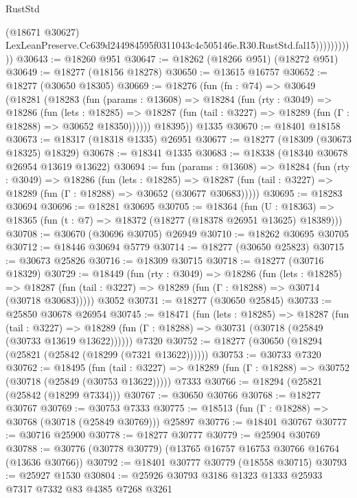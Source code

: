 \begin{lexlean}{RustStd}
\begin{coremodule}
                          (@18671 @30627)
                          LexLeanPreserve.Cc639d244984595f0311043c4c505146e.R30.RustStd.fal15)))))))))))
@30643 := @18260 @951
@30647 := @18262 (@18266 @951) (@18272 @951)
@30649 := @18277 (@18156 @18278)
@30650 := @13615 @16757
@30652 := @18277 (@30650 @18305)
@30669 := @18276
    (fun (fn : @74) =>
    @30649
      (@18281
        (@18283
          (fun (params : @13608) =>
          @18284
            (fun (rty : @3049) =>
            @18286
              (fun (lets : @18285) =>
              @18287 (fun (tail : @3227) => @18289 (fun (Γ : @18288) => @30652 @18350))))))
        @18395))
    @1335
@30670 := @18401 @18158
@30673 := @18317 (@18318 @1335) @26951
@30677 := @18277 (@18309 (@30673 @18325) @18329)
@30678 := @18341 @1335
@30683 := @18338 (@18340 @30678 @26954 @13619 @13622)
@30694 := fun (params : @13608) =>
  @18284
    (fun (rty : @3049) =>
    @18286
      (fun (lets : @18285) =>
      @18287 (fun (tail : @3227) => @18289 (fun (Γ : @18288) => @30652 (@30677 @30683)))))
@30695 := @18283 @30694
@30696 := @18281 @30695
@30705 := @18364
    (fun (U : @18363) => @18365 (fun (t : @7) => @18372 (@18277 (@18378 @26951 @13625) @18389)))
@30708 := @30670 (@30696 @30705) @26949
@30710 := @18262 @30695 @30705
@30712 := @18446 @30694 @5779
@30714 := @18277 (@30650 @25823)
@30715 := @30673 @25826
@30716 := @18309 @30715
@30718 := @18277 (@30716 @18329)
@30729 := @18449
    (fun (rty : @3049) =>
    @18286
      (fun (lets : @18285) =>
      @18287 (fun (tail : @3227) => @18289 (fun (Γ : @18288) => @30714 (@30718 @30683)))))
    @3052
@30731 := @18277 (@30650 @25845)
@30733 := @25850 @30678 @26954
@30745 := @18471
    (fun (lets : @18285) =>
    @18287
      (fun (tail : @3227) =>
      @18289 (fun (Γ : @18288) => @30731 (@30718 (@25849 (@30733 @13619 @13622))))))
    @7320
@30752 := @18277 (@30650 (@18294 (@25821 (@25842 (@18299 (@7321 @13622))))))
@30753 := @30733 @7320
@30762 := @18495
    (fun (tail : @3227) => @18289 (fun (Γ : @18288) => @30752 (@30718 (@25849 (@30753 @13622)))))
    @7333
@30766 := @18294 (@25821 (@25842 (@18299 @7334)))
@30767 := @30650 @30766
@30768 := @18277 @30767
@30769 := @30753 @7333
@30775 := @18513 (fun (Γ : @18288) => @30768 (@30718 (@25849 @30769))) @25897
@30776 := @18401 @30767
@30777 := @30716 @25900
@30778 := @18277 @30777
@30779 := @25904 @30769
@30788 := @30776 (@30778 @30779) (@13765 @16757 @16753 @30766 @16764 (@13636 @30766))
@30792 := @18401 @30777 @30779 (@18558 @30715)
@30793 := @25927 @1530
@30804 := @25926 @30793 @3186 @1323 @1333 @25933 @7317 @7332 @83 @4385 @7268 @3261

\end{coremodule}
\end{lexlean}
